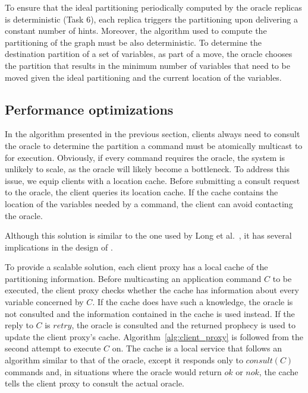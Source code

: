 To ensure that the ideal partitioning periodically computed by the oracle replicas is deterministic (Task 6), each replica triggers the partitioning upon delivering a constant number of hints.
Moreover, the algorithm used to compute the partitioning of the graph must be also deterministic.
To determine the destination partition of a set of variables, as part of a move, the oracle chooses the partition that results in the minimum number of variables that need to be moved given the ideal partitioning and the current location of the variables.

\subsection{Performance optimizations}
\label{sec:optm}

In the algorithm presented in the previous section, clients always need to consult the oracle to determine the partition a command must be atomically multicast to for execution.
Obviously, if every command requires the oracle, the system is unlikely to scale, as the oracle will likely become a bottleneck.
To address this issue, we equip clients with a location cache.
Before submitting a consult request to the oracle, the client queries its location cache.
If the cache contains the location of the variables needed by a command, the client can avoid contacting the oracle. 

Although this solution is similar to the one used by Long et al.~\cite{}, it has several implications in the design of \dynastar.

To provide a scalable solution, each client proxy has a local cache of the partitioning information.
Before multicasting an application command $C$ to be executed, the client proxy checks whether the cache has information about every variable concerned by $C$.
If the cache does have such a knowledge, the oracle is not consulted and the information contained in the cache is used instead.
If the reply to $C$ is $retry$, the oracle is consulted and the returned prophecy is used to update the client proxy's cache.
Algorithm~\ref{alg:client_proxy} is followed from the second attempt to execute $C$ on.
The cache is a local service that follows an algorithm similar to that of the oracle, except it responds only to $consult(C)$ commands and, in situations where the oracle would return $ok$ or $nok$, the cache tells the client proxy to consult the actual oracle.

